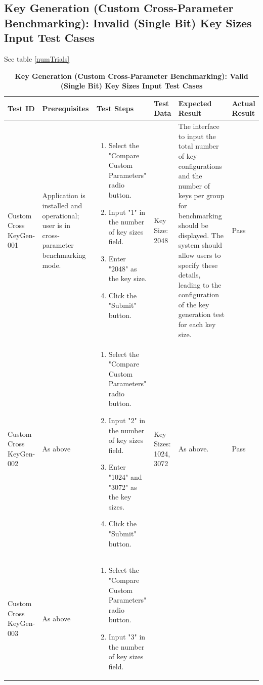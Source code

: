 \documentclass[]{final_report}
\theoremstyle{definition}
\begin{document}
\subsection*{Key Generation (Custom Cross-Parameter Benchmarking): Invalid (Single Bit) Key Sizes Input Test Cases}
See table \ref{numTrials}

\begin{longtable}{|p{1.5cm}|p{2.5cm}|p{3.5cm}|p{2.5cm}|p{3cm}|p{2cm}|}
  \caption{\textbf{Key Generation (Custom Cross-Parameter Benchmarking): Valid (Single Bit) Key Sizes Input Test Cases}} \\
  \hline
  \textbf{Test ID} & \textbf{Prerequisites} & \textbf{Test Steps} & \textbf{Test Data} & \textbf{Expected Result} & \textbf{Actual Result} \\
  \hline
  Custom
  Cross
  KeyGen-001 & Application is installed and operational; user is in cross-parameter benchmarking mode. & 
  \begin{enumerate}
    \item Select the "Compare Custom Parameters" radio button.
    \item Input "1" in the number of key sizes field.
    \item Enter "2048" as the key size.
    \item Click the "Submit" button.
  \end{enumerate} & Key Size: 2048 & The interface to input the total number of key configurations and the number of keys per group for benchmarking should be displayed. The system should allow users to specify these details, leading to the configuration of the key generation test for each key size. & Pass \\
  \hline
  Custom
  Cross
  KeyGen-002 & As above & 
  \begin{enumerate}
    \item Select the "Compare Custom Parameters" radio button.
    \item Input "2" in the number of key sizes field.
    \item Enter "1024" and "3072" as the key sizes.
    \item Click the "Submit" button.
  \end{enumerate} & Key Sizes: 1024, 3072 & As above. & Pass \\
  \hline
  Custom
  Cross
  KeyGen-003 & As above & 
  \begin{enumerate}
    \item Select the "Compare Custom Parameters" radio button.
    \item Input "3" in the number of key sizes field.

\end{enumerate}
\end{longtable}
\end{document}
